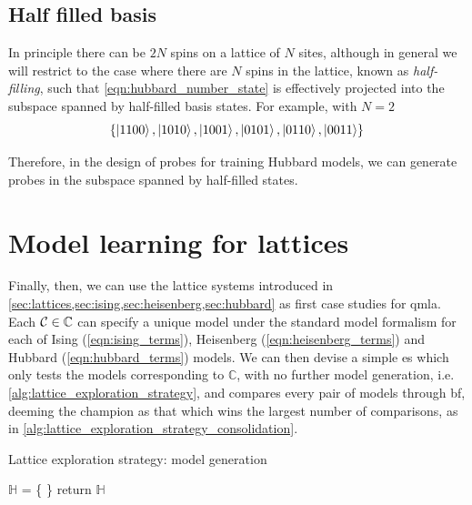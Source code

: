 \subsection{Half filled basis}
In principle there can be $2N$ spins on a lattice of $N$ sites, 
    although in general we will restrict to the case where there are $N$ spins in the lattice, 
    known as \emph{half-filling}, such that \cref{eqn:hubbard_number_state} is effectively projected into the subspace 
    spanned by half-filled basis states. 
For example, with $N=2$
\begin{equation}
    \label{eqn:hubbard_half_filled_basis_states}
    \{
        \ket{ 1100 }, \ket{ 1010 }, \ket{ 1001 }, 
        \ket{ 0101 }, \ket{ 0110 }, \ket{ 0011 }
    \}
\end{equation}

Therefore, in the design of probes for training Hubbard models, 
    we can generate probes in the subspace spanned by half-filled states. 

\section{Model learning for lattices}
Finally, then, we can use the lattice systems introduced in \cref{sec:lattices,sec:ising,sec:heisenberg,sec:hubbard}
    as first case studies for \gls{qmla}. 
Each ${ \mathcal{C}} \in \mathbb{C}$ can specify a unique model under the standard model formalism
    for each of Ising (\cref{eqn:ising_terms}), Heisenberg (\cref{eqn:heisenberg_terms}) 
    and Hubbard (\cref{eqn:hubbard_terms}) models.     
We can then devise a simple \gls{es} which only tests the models corresponding to $\mathbb{C}$, 
    with no further model generation, i.e. \cref{alg:lattice_exploration_strategy}, 
    and compares every pair of models through \gls{bf}, 
    deeming the champion as that which wins the largest number of comparisons, 
    as in \cref{alg:lattice_exploration_strategy_consolidation}.

\begin{algorithm}
    \caption{Lattice exploration strategy: model generation}
    \label{alg:lattice_exploration_strategy}
    \DontPrintSemicolon

    \;

    $\mathbb{H}$ = \{ \}\;
    return $\mathbb{H}$
\end{algorithm}

